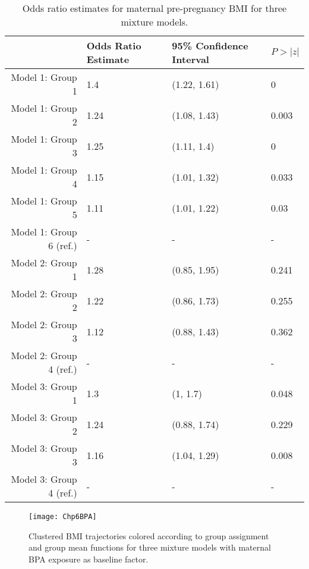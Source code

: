 \documentclass[11pt]{article}
\begin{document}
\begin{table}[ht]
\begin{center}
\begin{tabular}{rlll}
  \hline
 & Odds Ratio Estimate & 95\% Confidence Interval & $P>|z|$ \\ 
  \hline
Model 1: Group  1 & 1.4 & (1.22, 1.61) & 0 \\ 
  Model 1: Group  2 & 1.24 & (1.08, 1.43) & 0.003 \\ 
  Model 1: Group  3 & 1.25 & (1.11, 1.4) & 0 \\ 
  Model 1: Group  4 & 1.15 & (1.01, 1.32) & 0.033 \\ 
  Model 1: Group  5 & 1.11 & (1.01, 1.22) & 0.03 \\ 
  Model 1: Group  6  (ref.) & - & - & - \\ 
  Model 2: Group  1 & 1.28 & (0.85, 1.95) & 0.241 \\ 
  Model 2: Group  2 & 1.22 & (0.86, 1.73) & 0.255 \\ 
  Model 2: Group  3 & 1.12 & (0.88, 1.43) & 0.362 \\ 
  Model 2: Group  4  (ref.) & - & - & - \\ 
  Model 3: Group  1 & 1.3 & (1, 1.7) & 0.048 \\ 
  Model 3: Group  2 & 1.24 & (0.88, 1.74) & 0.229 \\ 
  Model 3: Group  3 & 1.16 & (1.04, 1.29) & 0.008 \\ 
  Model 3: Group  4  (ref.) & - & - & - \\ 
   \hline
\end{tabular}
\caption{Odds ratio estimates for maternal pre-pregnancy BMI for three mixture models. }
\end{center}
\end{table}
\begin{figure}[h]
\begin{center}
\texttt{[image: Chp6BPA]}
\end{center}
\label{fig:dataresults}
\caption{Clustered BMI trajectories colored according to group assignment and group mean functions for three mixture models with maternal BPA exposure as baseline factor.}
\end{figure}
\end{document}
